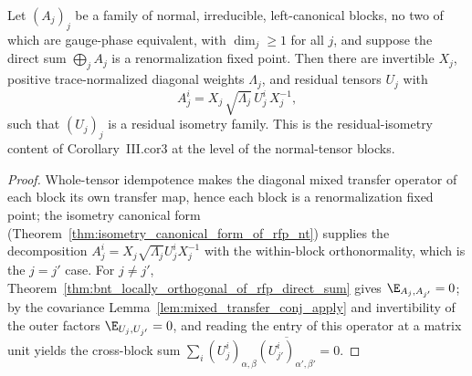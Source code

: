 \begin{theorem}%
    \label{thm:residual_isometry_of_rfp_direct_sum}
    \leanok
    Let $(A_j)_j$ be a family of normal, irreducible, left-canonical blocks, no
    two of which are gauge-phase equivalent, with $\dim_j \ge 1$ for all $j$, and
    suppose the direct sum $\bigoplus_j A_j$ is a renormalization fixed point.
    Then there are invertible
    $X_j$, positive trace-normalized diagonal weights $\Lambda_j$, and residual
    tensors $U_j$ with
    \[
        A_j^i = X_j\,\sqrt{\Lambda_j}\,U_j^i\,X_j^{-1},
    \]
    such that $(U_j)_j$ is a residual isometry family. This is the
    residual-isometry content of Corollary~III.cor3
    \cite[Corollary~III.3]{Cirac2016MPDO_arXiv} at the level of the normal-tensor
    blocks.
\end{theorem}
\begin{proof}\leanok
    Whole-tensor idempotence makes the diagonal mixed transfer operator of each
    block its own transfer map, hence each block is a renormalization fixed
    point; the isometry canonical form
    (Theorem~\ref{thm:isometry_canonical_form_of_rfp_nt}) supplies the
    decomposition $A_j^i = X_j\sqrt{\Lambda_j}U_j^iX_j^{-1}$ with the within-block
    orthonormality, which is the $j=j'$ case. For $j\ne j'$,
    Theorem~\ref{thm:bnt_locally_orthogonal_of_rfp_direct_sum} gives
    $\E_{A_j,A_{j'}}=0$; by the covariance
    Lemma~\ref{lem:mixed_transfer_conj_apply} and invertibility of the outer
    factors $\E_{U_j,U_{j'}}=0$, and reading the entry of this operator at a
    matrix unit yields the cross-block sum
    $\sum_i (U_j^i)_{\alpha,\beta}\overline{(U_{j'}^i)_{\alpha',\beta'}}=0$.
\end{proof}

